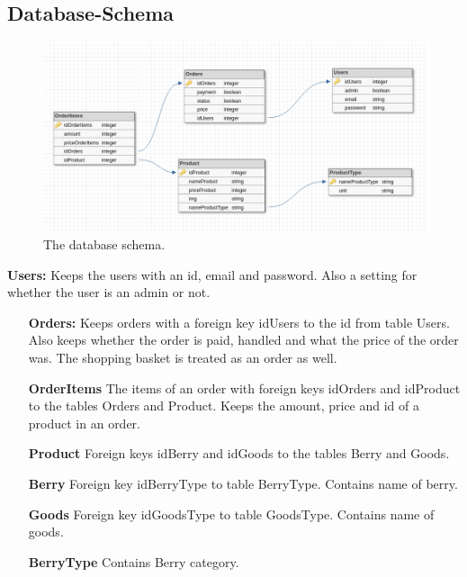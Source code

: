 \newpage

\subsection{Database-Schema}

\begin{figure}[H]
  \centering
  \includegraphics[width=\textwidth]{second_sprint/db_schema.png}
  \caption{\label{fig:schema} The database schema.}
\end{figure}

\textbf{Users:} Keeps the users with an id, email and password. Also a
setting for whether the user is an admin or not.

\begin{itemize}
  \item[\textbf{Orders:}] Keeps orders with a foreign key idUsers to the
    id from table Users. Also keeps whether the order is paid, handled and
    what the price of the order was. The shopping basket is treated as an
    order as well.
  \item[\textbf{OrderItems}] The items of an order with foreign keys
    idOrders and idProduct to the tables Orders and Product.  Keeps the
    amount, price and id of a product in an order.
  \item[\textbf{Product}] Foreign keys idBerry and idGoods to the tables
    Berry and Goods.
  \item[\textbf{Berry}] Foreign key idBerryType to table BerryType. Contains
    name of berry.
  \item[\textbf{Goods}] Foreign key idGoodsType to table GoodsType. Contains
    name of goods.
  \item[\textbf{BerryType}] Contains Berry category.
\end{itemize}
